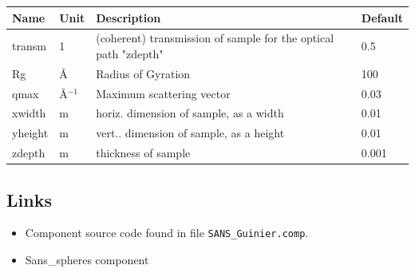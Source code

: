 \begin{longtable}{p{}p{}p{}p{}}
\toprule
\textbf{Name} & \textbf{Unit} & \textbf{Description} & \textbf{Default} \\
\midrule
\endhead
transm & 1 & (coherent) transmission of sample for the optical path "zdepth" & 0.5 \\
Rg & \AA{} & Radius of Gyration & 100 \\
qmax & \AA{}$^{-1}$ & Maximum scattering vector & 0.03 \\
xwidth & m & horiz. dimension of sample, as a width & 0.01 \\
yheight & m & vert.. dimension of sample, as a height & 0.01 \\
zdepth & m & thickness of sample & 0.001 \\
\bottomrule
\end{longtable}

\subsection*{Links}
\begin{itemize}
  \item Component source code found in file \texttt{SANS\_Guinier.comp}.
  \item Sans\_spheres component
\end{itemize}
